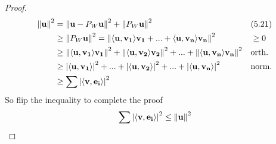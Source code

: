 \begin{enumerate}
\begin{proof}
        \begin{align}
            \norm{\vb{u}}^2 &= \norm{\vb{u} - P_W\vb{u}}^2 + \norm{P_W\vb{u}}^2 && (5.21)\\
            &\ge \norm{P_W\vb{u}}^2 = \norm{\langle \vb{u}, \vb{v_1} \rangle \vb{v_1} + ... + \langle \vb{u}, \vb{v_n} \rangle \vb{v_n}}^2 && \ge 0\\
            &\ge \norm{\langle \vb{u}, \vb{v_1} \rangle \vb{v_1}}^2 + \norm{\langle \vb{u}, \vb{v_2} \rangle \vb{v_2}}^2 + ... + \norm{\langle \vb{u}, \vb{v_n} \rangle \vb{v_n}}^2 && \text{orth.}\\
            &\ge \abs{\langle \vb{u}, \vb{v_1} \rangle}^2 + ... + \abs{\langle \vb{u}, \vb{v_2} \rangle}^2 + ... + \abs{\langle \vb{u}, \vb{v_n} \rangle}^2 && \text{norm.}\\
            & \ge \sum \abs{\langle \vb{v}, \vb{e_i} \rangle}^2
        \end{align}
        So flip the inequality to complete the proof
        \begin{align}
            \sum \abs{\langle \vb{v}, \vb{e_i} \rangle}^2 \le \norm{\vb{u}}^2
        \end{align}
    \end{proof}
\end{enumerate}